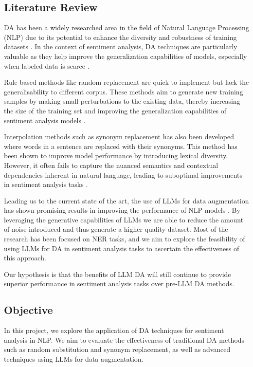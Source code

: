 \documentclass{article}
\begin{document}
\subsection{Literature Review}

DA has been a widely researched area in the field of Natural Language
Processing (NLP) due to its potential to enhance the diversity and robustness
of training datasets \cite{DBLP:journals/corr/abs-2105-03075}. In the context
of sentiment analysis, DA techniques are particularly valuable as they help
improve the generalization capabilities of models, especially when labeled data
is scarce \cite{li-specia-2019-improving}.

Rule based methods like random replacement are quick to implement but lack the
generalisability to different corpus. These methods aim to generate new
training samples by making small perturbations to the existing data, thereby
increasing the size of the training set and improving the generalization
capabilities of sentiment analysis models \cite{wei-zou-2019-eda}.

Interpolation methods such as synonym replacement has also been developed
\cite{sahin-steedman-2018-data} where words in a sentence are replaced with
their synonyms. This method has been shown to improve model performance by
introducing lexical diversity. However, it often fails to capture the nuanced
semantics and contextual dependencies inherent in natural language, leading to
suboptimal improvements in sentiment analysis tasks
\cite{sahin-steedman-2018-data}.

Leading us to the current state of the art, the use of LLMs for data
augmentation has shown promising results in improving the performance of NLP
models \cite{ding-etal-2024-data}. By leveraging the generative capabilities of
LLMs we are able to reduce the amount of noise introduced and thus generate a
higher quality dataset. Most of the research has been focused on NER tasks, and
we aim to explore the feasibility of using LLMs for DA in sentiment analysis
tasks to ascertain the effectiveness of this approach.

Our hypothesis is that the benefits of LLM DA will still continue to provide
superior performance in sentiment analysis tasks over pre-LLM DA methods.

\subsection{Objective}

In this project, we explore the application of DA techniques for sentiment
analysis in NLP. We aim to evaluate the effectiveness of traditional DA methods
such as random substitution and synonym replacement, as well as advanced
techniques using LLMs for data augmentation.
\end{document}
